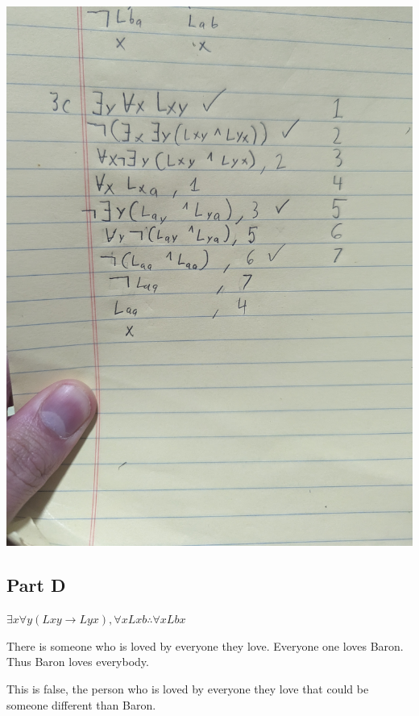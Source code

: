\documentclass[12pt]{article}
\begin{document}
\includegraphics[width=\textwidth]{3c}

\subsection*{Part D}

$\exists x \forall y (Lxy \rightarrow Lyx), \forall x Lxb \therefore \forall x Lbx$

There is someone who is loved by everyone they love. Everyone one loves Baron. Thus Baron loves everybody.

This is false, the person who is loved by everyone they love that could be someone different than Baron. 
\end{document}

